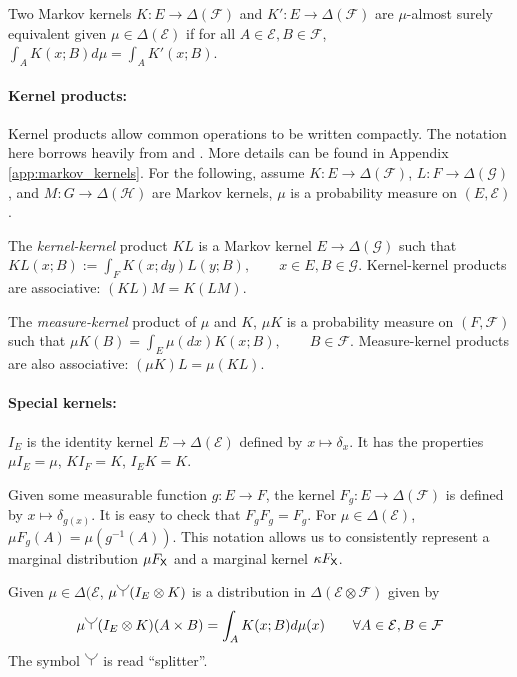 Two Markov kernels $K:E\to \Delta(\mathcal{F})$ and $K':E\to \Delta(\mathcal{F})$ are $\mu$-almost surely equivalent given $\mu\in \Delta(\mathcal{E})$ if for all $A\in \mathcal{E}, B\in\mathcal{F}$, $\int_A K(x;B) d\mu = \int_A K'(x;B)$.


\paragraph*{Kernel products:} Kernel products allow common operations to be written compactly. The notation here borrows heavily from \cite{cinlar_probability_2011} and \cite{fong_causal_2013}. More details can be found in Appendix \ref{app:markov_kernels}. For the following, assume $K:E\to \Delta(\mathcal{F})$, $L:F\to \Delta(\mathcal{G})$, and $M:G\to \Delta(\mathcal{H})$ are Markov kernels, $\mu$ is a probability measure on $(E,\mathcal{E})$. 

The \emph{kernel-kernel} product $KL$ is a Markov kernel $E\to \Delta(\mathcal{G})$ such that $KL(x;B):= \int_F K(x;dy) L(y;B),\qquad x\in E, B\in \mathcal{G}$. Kernel-kernel products are associative: $(KL)M=K(LM)$.

The \emph{measure-kernel} product of $\mu$ and $K$, $\mu K$ is a probability measure on $(F,\mathcal{F})$ such that $\mu K(B)=\int_E \mu(dx) K(x;B),\qquad B\in\mathcal{F}$. Measure-kernel products are also associative: $(\mu K)L = \mu (KL)$.

\paragraph*{Special kernels:} $I_E$ is the identity kernel $E\to \Delta(\mathcal{E})$ defined by $x\mapsto \delta_x$. It has the properties $\mu I_E=\mu$, $KI_F = K$, $I_E K = K$.

Given some measurable function $g:E\to F$, the kernel $F_g:E\to \Delta(\mathcal{F})$ is defined by $x\mapsto \delta_{g(x)}$. It is easy to check that $F_g F_g = F_g$. For $\mu\in \Delta(\mathcal{E})$, $\mu F_g (A) = \mu(g^{-1}(A))$. This notation allows us to consistently represent a marginal distribution $\mu F_{\mathsf{X}}$ and a marginal kernel $\kappa F_{\mathsf{X}}$.

Given $\mu\in \Delta(\mathcal{E}$, $\mu\splitter{0.15}(I_E\otimes K)$ is a distribution in $\Delta(\mathcal{E}\otimes\mathcal{F})$ given by
\begin{align}
    \mu\splitter{0.15}(I_E\otimes K)(A\times B) = \int_A K(x;B) d\mu(x)\qquad \forall A\in \mathcal{E},B\in \mathcal{F}
\end{align}
The symbol $\splitter{0.15}$ is read ``splitter''.





